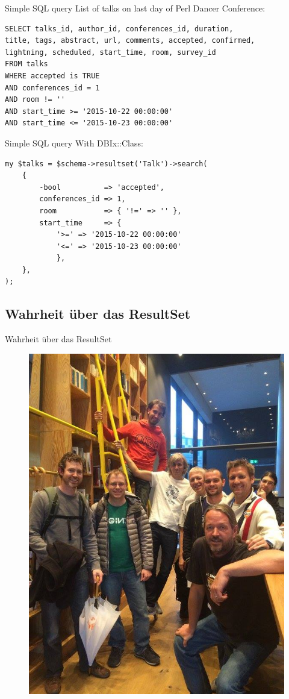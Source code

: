 \begin{frame}[fragile]{Simple SQL query}
List of talks on last day of Perl Dancer Conference:
\begin{lstlisting}
SELECT talks_id, author_id, conferences_id, duration,
title, tags, abstract, url, comments, accepted, confirmed, 
lightning, scheduled, start_time, room, survey_id 
FROM talks 
WHERE accepted is TRUE 
AND conferences_id = 1 
AND room != '' 
AND start_time >= '2015-10-22 00:00:00'
AND start_time <= '2015-10-23 00:00:00'
\end{lstlisting}
\end{frame}

\begin{frame}[fragile]{Simple SQL query}
With DBIx::Class:
\begin{lstlisting}
my $talks = $schema->resultset('Talk')->search(
    {
        -bool          => 'accepted',
        conferences_id => 1,
        room           => { '!=' => '' },
        start_time     => {
            '>=' => '2015-10-22 00:00:00'
            '<=' => '2015-10-23 00:00:00'
            },
    },
);
\end{lstlisting}
\end{frame}

\subsection{Wahrheit über das ResultSet}

\begin{frame}{Wahrheit über das ResultSet}
\begin{figure}[!ht]
\centering
\includegraphics[width=0.5\linewidth]{img/pdc_users.jpg}
\end{figure}
\end{frame}

